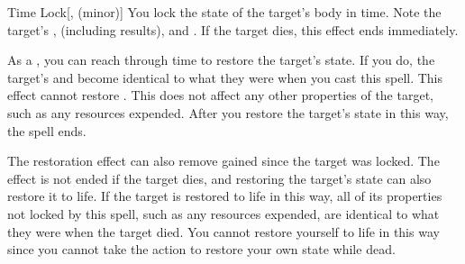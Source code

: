 \lowercase{\hypertarget{spell:Time Lock}{}}\label{spell:Time Lock}
\begin{freeability}[Rank 4]{\hypertarget{spell:Time Lock}{Time Lock}}[,  (minor)]
You lock the state of the target's body in time.
Note the target's ,  (including  results), and .
If the target dies, this effect ends immediately.

As a , you can reach through time to restore the target's state.
If you do, the target's  and  become identical to what they were when you cast this spell.
This effect cannot restore .
This does not affect any other properties of the target, such as any resources expended.
After you restore the target's state in this way, the spell ends.

\rankline
{} The restoration effect can also remove  gained since the target was locked.
 The effect is not ended if the target dies, and restoring the target's state can also restore it to life.
If the target is restored to life in this way, all of its properties not locked by this spell, such as any resources expended, are identical to what they were when the target died.
You cannot restore yourself to life in this way since you cannot take the action to restore your own state while dead.
\end{freeability}
\vspace{0.25em}



